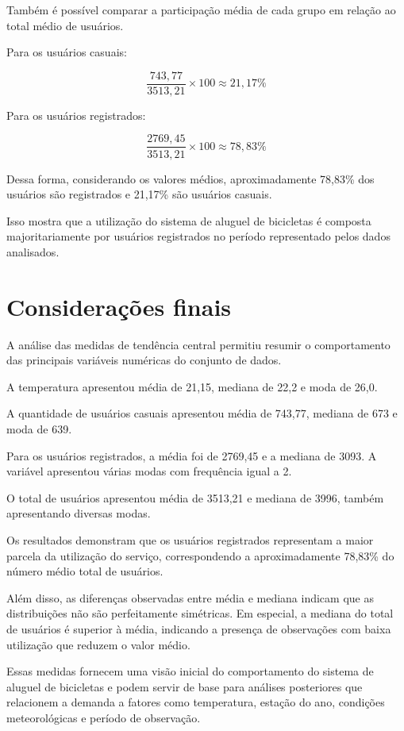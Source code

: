 \documentclass[12pt,a4paper]{article}
\begin{document}
Também é possível comparar a participação média de cada grupo em relação ao
total médio de usuários.

Para os usuários casuais:

\begin{equation}
\frac{743{,}77}{3513{,}21} \times 100
\approx 21{,}17\%
\end{equation}

Para os usuários registrados:

\begin{equation}
\frac{2769{,}45}{3513{,}21} \times 100
\approx 78{,}83\%
\end{equation}

Dessa forma, considerando os valores médios, aproximadamente 78,83\% dos
usuários são registrados e 21,17\% são usuários casuais.

Isso mostra que a utilização do sistema de aluguel de bicicletas é composta
majoritariamente por usuários registrados no período representado pelos
dados analisados.

\section{Considerações finais}

A análise das medidas de tendência central permitiu resumir o comportamento
das principais variáveis numéricas do conjunto de dados.

A temperatura apresentou média de 21,15, mediana de 22,2 e moda de 26,0.

A quantidade de usuários casuais apresentou média de 743,77, mediana de 673
e moda de 639.

Para os usuários registrados, a média foi de 2769,45 e a mediana de 3093.
A variável apresentou várias modas com frequência igual a 2.

O total de usuários apresentou média de 3513,21 e mediana de 3996, também
apresentando diversas modas.

Os resultados demonstram que os usuários registrados representam a maior
parcela da utilização do serviço, correspondendo a aproximadamente 78,83\%
do número médio total de usuários.

Além disso, as diferenças observadas entre média e mediana indicam que as
distribuições não são perfeitamente simétricas. Em especial, a mediana do
total de usuários é superior à média, indicando a presença de observações
com baixa utilização que reduzem o valor médio.

Essas medidas fornecem uma visão inicial do comportamento do sistema de
aluguel de bicicletas e podem servir de base para análises posteriores que
relacionem a demanda a fatores como temperatura, estação do ano, condições
meteorológicas e período de observação.
\end{document}
